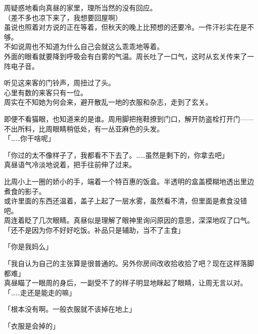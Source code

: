 周疑惑地看向真昼的家里，理所当然的没有回应。\\

（差不多也凉下来了，我想要回屋啊）\\

虽说也照着对方说的正在等着，但秋天的晚上比预想的还要冷。一件汗衫实在是不够。\\

不如说周也不知道为什么自己会就这么乖乖地等着。\\

外面的眼看就要降到呼吸会有白雾的气温。周长吐了一口气，这时从玄关传来了一阵电子音。

听见这来客的门铃声，周扭过了头。\\

心里有数的来客只有一位。\\

周实在不知她为何会来，避开散乱一地的衣服和杂志，走到了玄关。

即便不看猫眼，也知道来的是谁。周用脚把拖鞋撩到门口，解开防盗栓打开门——不出所料，比周眼睛稍低处，有一丛亚麻色的头发。\\

「……你干啥呢」

「你过的太不像样子了，我都看不下去了。……虽然是剩下的，你拿去吧」\\

真昼语气冷淡地说着，把手往前伸了过来。

比周小上一圈的娇小的手，端着一个特百惠的饭盒。半透明的盒盖模糊地透出里边煮食的影子。\\

或许里面的东西还温着，盖子上起了一层水雾，虽然看不清，但里面是煮食没错吧。\\

周连着眨了几次眼睛。真昼似是理解了眼神里询问原因的意思，深深地叹了口气。\\

「还不是因为你不好好吃饭。补品只是辅助，当不了主食」

「你是我妈么」

「我自认为自己的主张算是很普通的。另外你房间改收拾收拾了吧？现在这样落脚都难」\\

真昼瞄了一眼周的身后，一副受不了的样子明显地眯起了眼睛，让周无言以对。\\

「……走还是能走的嘛」

「根本没有啊。一般衣服就不该掉在地上」

「衣服是会掉的」


